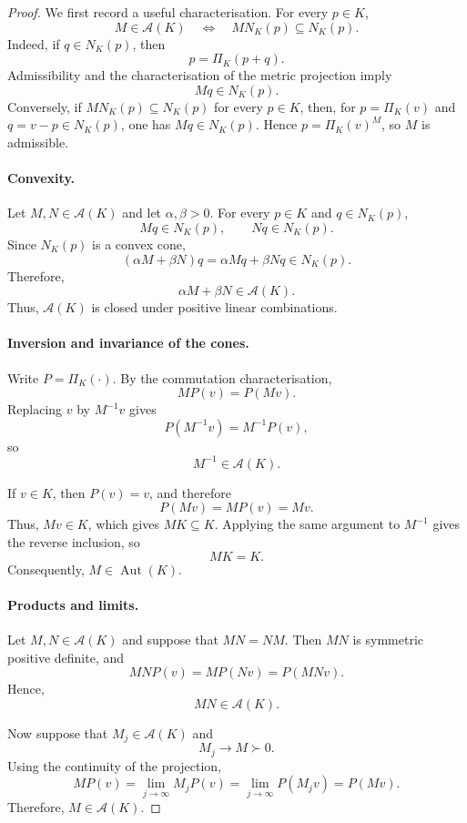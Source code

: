 \documentclass[a4paper,11pt]{book}
\theoremstyle{plain}
\theoremstyle{definition}
\theoremstyle{remark}
\numberwithin{equation}{chapter}
\numberwithin{algorithm}{chapter}
\newcommand{\proj}[2]{\Pi_{#2}\!\left(#1\right)}
\begin{document}
	\begin{proof}
		We first record a useful characterisation. For every $p\in K$,
		\[
		M\in\mathcal A(K)
		\quad\Longleftrightarrow\quad
		MN_K(p)\subseteq N_K(p).
		\]
		Indeed, if $q\in N_K(p)$, then
		\[
		p=\proj{p+q}{K}.
		\]
		Admissibility and the characterisation of the metric projection imply
		\[
		Mq\in N_K(p).
		\]
		Conversely, if $MN_K(p)\subseteq N_K(p)$ for every $p\in K$, then, for
		$p=\proj{v}{K}$ and $q=v-p\in N_K(p)$, one has $Mq\in N_K(p)$. Hence
		$p=\proj{v}{K}^{M}$, so $M$ is admissible.
		
		\paragraph{Convexity.}
		Let $M,N\in\mathcal A(K)$ and let $\alpha,\beta>0$. For every $p\in K$ and
		$q\in N_K(p)$,
		\[
		Mq\in N_K(p),
		\qquad
		Nq\in N_K(p).
		\]
		Since $N_K(p)$ is a convex cone,
		\[
		(\alpha M+\beta N)q
		=
		\alpha Mq+\beta Nq
		\in N_K(p).
		\]
		Therefore,
		\[
		\alpha M+\beta N\in\mathcal A(K).
		\]
		Thus, $\mathcal A(K)$ is closed under positive linear combinations.
		
		\paragraph{Inversion and invariance of the cones.}
		Write $P=\proj{\cdot}{K}$. By the commutation characterisation,
		\[
		MP(v)=P(Mv).
		\]
		Replacing $v$ by $M^{-1}v$ gives
		\[
		P(M^{-1}v)=M^{-1}P(v),
		\]
		so
		\[
		M^{-1}\in\mathcal A(K).
		\]
		
		If $v\in K$, then $P(v)=v$, and therefore
		\[
		P(Mv)=MP(v)=Mv.
		\]
		Thus, $Mv\in K$, which gives $MK\subseteq K$. Applying the same argument to
		$M^{-1}$ gives the reverse inclusion, so
		\[
		MK=K.
		\]
		Consequently, $M\in\operatorname{Aut}(K)$.
		
		\paragraph{Products and limits.}
		Let $M,N\in\mathcal A(K)$ and suppose that $MN=NM$. Then $MN$ is symmetric
		positive definite, and
		\[
		MNP(v)
		=
		MP(Nv)
		=
		P(MNv).
		\]
		Hence,
		\[
		MN\in\mathcal A(K).
		\]
		
		Now suppose that $M_j\in\mathcal A(K)$ and
		\[
		M_j\longrightarrow M\succ0.
		\]
		Using the continuity of the projection,
		\[
		MP(v)
		=
		\lim_{j\to\infty}M_jP(v)
		=
		\lim_{j\to\infty}P(M_jv)
		=
		P(Mv).
		\]
		Therefore, $M\in\mathcal A(K)$.
		

\end{proof}
\end{document}
